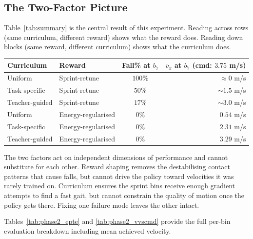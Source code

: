 \documentclass[a4paper,11pt]{article}
\begin{document}
    \subsection{The Two-Factor Picture}

    Table~\ref{tab:summary} is the central result of this experiment. Reading across rows (same curriculum, different reward) shows what the reward does. Reading down blocks (same reward, different curriculum) shows what the curriculum does.

    \begin{center}
    \begin{tabular}{@{}l l c r@{}}
    \toprule
    \textbf{Curriculum} & \textbf{Reward} & \textbf{Fall\% at $b_7$} & \textbf{$\bar v_x$ at $b_7$ (cmd: $3.75$ m/s)} \\
    \midrule
    Uniform        & Sprint-retune      & $100\%$ & ${\approx}0$ m/s \\
    Task-specific  & Sprint-retune      & $50\%$  & ${\sim}1.5$ m/s \\
    Teacher-guided & Sprint-retune      & $17\%$  & ${\sim}3.0$ m/s \\
    \midrule
    Uniform        & Energy-regularised & $0\%$   & $0.54$ m/s \\
    Task-specific  & Energy-regularised & $0\%$   & $2.31$ m/s \\
    Teacher-guided & Energy-regularised & $0\%$   & $3.29$ m/s \\
    \bottomrule
    \end{tabular}
    \label{tab:summary}
    \end{center}

    The two factors act on independent dimensions of performance and cannot substitute for each other. Reward shaping removes the destabilising contact patterns that cause falls, but cannot drive the policy toward velocities it was rarely trained on. Curriculum ensures the sprint bins receive enough gradient attempts to find a fast gait, but cannot constrain the quality of motion once the policy gets there. Fixing one failure mode leaves the other intact.

    Tables~\ref{tab:phase2_epte} and \ref{tab:phase2_vvscmd} provide the full per-bin evaluation breakdown including mean achieved velocity.
\end{document}
